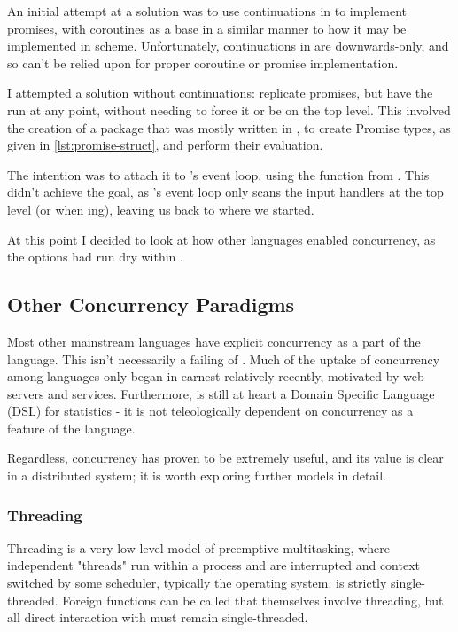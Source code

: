 An initial attempt at a solution was to use continuations in \R{} to implement promises, with coroutines as a base in a similar manner to how it may be implemented in scheme.
Unfortunately, continuations in \R{} are downwards-only, and so can't be relied upon for proper coroutine or promise implementation.

I attempted a solution without continuations: replicate promises, but have the  run at any point, without needing to force it or be on the top level.
This involved the creation of a package that was mostly written in , to create Promise types, as given in \cref{lst:promise-struct}, and perform their evaluation.


The intention was to attach it to \R{}'s event loop, using the  function from .
This didn't achieve the goal, as \R{}'s event loop only scans the input handlers at the top level (or when ing), leaving us back to where we started.

At this point I decided to look at how other languages enabled concurrency, as the options had run dry within \R{}.

\subsection{Other Concurrency Paradigms}

Most other mainstream languages have explicit concurrency as a part of the language.
This isn't necessarily a failing of \R{}.
Much of the uptake of concurrency among languages only began in earnest relatively recently, motivated by web servers and services.
Furthermore, \R{} is still at heart a Domain Specific Language (DSL) for statistics - it is not teleologically dependent on concurrency as a feature of the language.

Regardless, concurrency has proven to be extremely useful, and its value is clear in a distributed system; it is worth exploring further models in detail.

\subsubsection{Threading}

Threading is a very low-level model of preemptive multitasking, where independent "threads" run within a process and are interrupted and context switched by some scheduler, typically the operating system.
\R{} is strictly single-threaded.
Foreign  functions can be called that themselves involve threading, but all direct interaction with \R{} must remain single-threaded.

